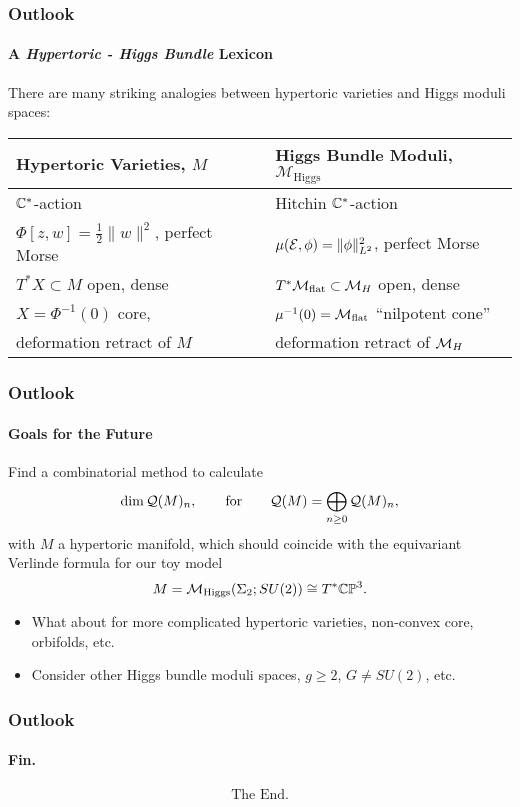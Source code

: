 \begin{frame}
	\frametitle{Outlook}
	\framesubtitle{A \emph{Hypertoric - Higgs Bundle} Lexicon}
	
	There are many striking analogies between hypertoric varieties and Higgs moduli spaces:
	\begin{table}[]
		\begin{tabular}{|l|l|}
			\hline
			Hypertoric Varieties, $M$ & Higgs Bundle Moduli, $\mathcal{M}_{\text{Higgs}}$   \\ \hline
			$\mathbb{C}^{\ast}$-action  & Hitchin $\mathbb{C}^{\ast}$-action                          \\ \hline
			$\Phi[z,w] = \tfrac{1}{2}\|w\|^{2}$, perfect Morse & $\mu(\mathcal{E},\phi) = \|\phi\|_{L^{2}}^{2}$, perfect Morse 							\\ \hline
			$T^{\ast}X \subset M$ open, dense & $T^{\ast}\mathcal{M}_{\text{\text{flat}}} \subset \mathcal{M}_{H}$ open, dense \\ \hline
			$X={\Phi^{-1}(0)}$ core, & $\mu^{-1}(0) = \mathcal{M}_{\text{flat}}$ ``nilpotent cone'' \\ 
			deformation retract of $M$ & deformation retract of $\mathcal{M}_{H}$ \\ \hline
		\end{tabular}
	\end{table}

\end{frame}

\begin{frame}
	\frametitle{Outlook}
	\framesubtitle{Goals for the Future}
	
	\begin{goal}
		Find a combinatorial method to calculate
		$$
			\dim \mathcal{Q}(M)_{n},\qquad \text{for} \qquad \mathcal{Q}(M) = \bigoplus_{n\geq 0} \mathcal{Q}(M)_{n},
		$$
		with $M$ a hypertoric manifold, which should coincide with the equivariant Verlinde formula for our toy model $$M= \mathcal{M}_{\text{Higgs}}(\Sigma_{2};SU(2)) \cong  T^{\ast}\mathbb{C}\mathbb{P}^{3}.$$
	\end{goal}

	\begin{qstn}
		\begin{itemize}
			\item What about for more complicated hypertoric varieties, \eg non-convex core, orbifolds, etc.
			\item Consider other Higgs bundle moduli spaces, \eg $g \geq 2$, $G \neq SU(2)$, etc.
		\end{itemize}
	\end{qstn}
	
\end{frame}

\begin{frame}
	\frametitle{Outlook}
	\framesubtitle{Fin.}
	
	$$
		\text{The End.}
	$$
	
\end{frame}



